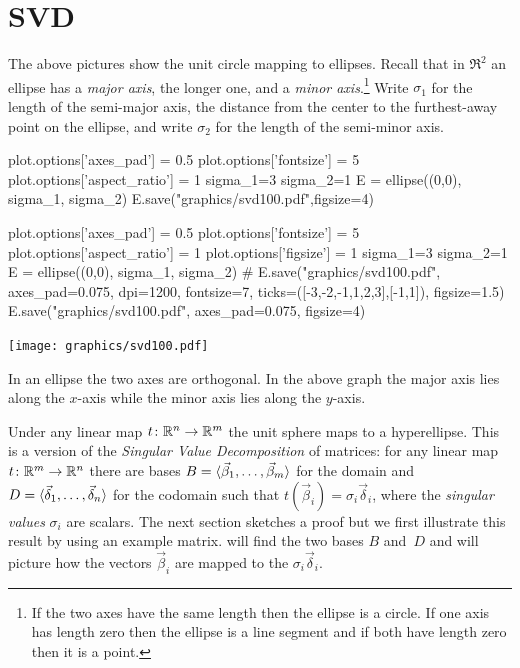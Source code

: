 \section{SVD}
The above pictures show the unit circle mapping to ellipses.
Recall that in $\Re^2$ an ellipse has a \textit{major axis}, 
the longer one, and a 
\textit{minor axis}.\footnote{If the two axes have the same length 
then the ellipse is a circle.
If one axis has length zero then the ellipse is a line segment 
and if both have length zero then it is a point.}
Write $\sigma_1$ for the length of the semi-major axis, 
the distance from the center to the furthest-away point on the ellipse,
and write $\sigma_2$ for the length of the semi-minor axis.
\begin{sageoutput}[d,0,3]
plot.options['axes_pad'] = 0.5
plot.options['fontsize'] = 5
plot.options['aspect_ratio'] = 1
sigma_1=3
sigma_2=1
E = ellipse((0,0), sigma_1, sigma_2)
E.save("graphics/svd100.pdf",figsize=4)
\end{sageoutput}
\begin{sagesilent}
plot.options['axes_pad'] = 0.5
plot.options['fontsize'] = 5
plot.options['aspect_ratio'] = 1
plot.options['figsize'] = 1
sigma_1=3
sigma_2=1
E = ellipse((0,0), sigma_1, sigma_2)
# E.save("graphics/svd100.pdf", axes_pad=0.075, dpi=1200, fontsize=7, ticks=([-3,-2,-1,1,2,3],[-1,1]), figsize=1.5)
E.save("graphics/svd100.pdf", axes_pad=0.075, figsize=4)
\end{sagesilent}
\begin{center}
  \texttt{[image: graphics/svd100.pdf]}
\end{center}
In an ellipse the two axes are orthogonal.
In the above graph the major axis lies along the $x$-axis while the
minor axis lies along the $y$-axis.

Under any linear map $\mbox{$t\colon \mathbb{R}^n\to \mathbb{R}^m$}$ the 
unit sphere maps to a hyperellipse.
This is a version of the \textit{Singular Value Decomposition} of
matrices:
for any linear map $\mbox{$t\colon \mathbb{R}^m\to \mathbb{R}^n$}$ there are bases
$B=\langle\vec{\beta}_1,\ldots,\vec{\beta}_m\rangle$ for the domain and
$D=\langle\vec{\delta}_1,\ldots,\vec{\delta}_n\rangle$ for the codomain
such that $t(\vec{\beta}_i)=\sigma_i\vec{\delta}_i$, where the
\textit{singular values}
$\sigma_i$ are scalars.
The next section sketches a proof
but we first illustrate this result by using an example matrix.
\Sage{} will find the two bases $B$ and~$D$ and will picture how the 
vectors $\vec{\beta}_i$ 
are mapped to the $\sigma_i\vec{\delta}_i$.

